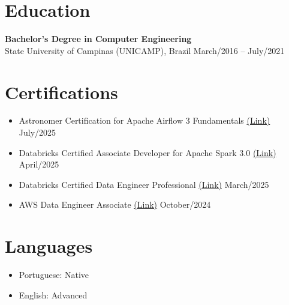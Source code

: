 \documentclass[a4paper,10pt]{article}
\begin{document}
\section*{Education}
\textbf{Bachelor's Degree in Computer Engineering} \\ State University of Campinas (UNICAMP), Brazil \hfill March/2016 -- July/2021

\section*{Certifications}
\begin{itemize}[leftmargin=*]
    \item 
Astronomer Certification for Apache Airflow 3 Fundamentals \href{https://www.credly.com/earner/earned/badge/f18038a5-0e67-41b9-a58a-f7008a817c29}{(Link)} \hfill July/2025
    \item Databricks Certified Associate Developer for Apache Spark 3.0  \href{https://credentials.databricks.com/d06f726f-0aa4-47aa-a307-4d21f05046c9#acc.iLVx517o}{(Link)} \hfill April/2025
    \item Databricks Certified Data Engineer Professional  \href{https://credentials.databricks.com/0511daa7-c389-4f36-95da-e7fdfe6d9118#acc.uOZgFkWy}{(Link)} \hfill March/2025
    \item AWS Data Engineer Associate \href{https://www.credly.com/badges/40904cd1-1c10-43c5-809a-e4750b2f7ec5/linked_in_profile}{(Link)} \hfill October/2024
\end{itemize}

\section*{Languages}
\begin{itemize}[leftmargin=*]
    \item Portuguese: Native
    \item English: Advanced
\end{itemize}
\end{document}
